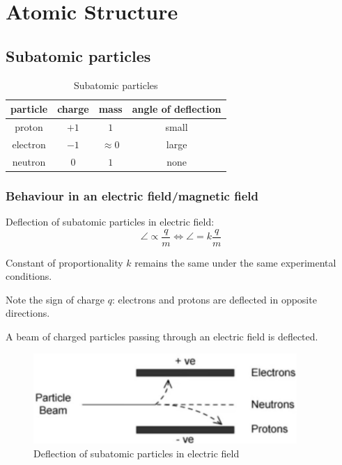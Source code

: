 \section{Atomic Structure}
\subsection{Subatomic particles}
\begin{table}[H]
\centering
\begin{tabular}{cccc}
\hline\hline
\textbf{particle} & \textbf{charge} & \textbf{mass} & \textbf{angle of deflection} \\
\hline
proton & $+1$ & $1$ & small \\
electron & $-1$ & $\approx 0$ & large \\
neutron & $0$ & $1$ & none \\
\hline\hline
\end{tabular}
\caption{Subatomic particles}
\end{table}

\subsubsection{Behaviour in an electric field/magnetic field}
Deflection of subatomic particles in electric field:
\begin{equation}
\angle \propto \frac{q}{m} \iff \angle = k\frac{q}{m}
\end{equation}
\begin{remark}
Constant of proportionality $k$ remains the same under the same experimental conditions.
\end{remark}
\begin{remark}
Note the sign of charge $q$: electrons and protons are deflected in opposite directions.
\end{remark}

A beam of charged particles passing through an electric field is deflected.
\begin{figure}[H]
    \centering
    \includegraphics[width=10cm]{images/sub_particle_deflectn.jpg}
    \caption{Deflection of subatomic particles in electric field}
\end{figure}

